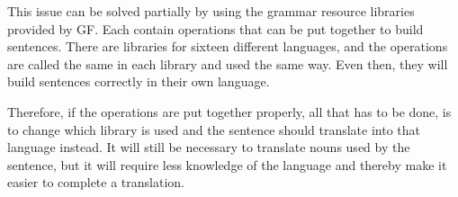 This issue can be solved partially by using the grammar resource libraries provided by GF. Each contain operations that can be put together to build sentences. There are libraries for sixteen different languages, and the operations are called the same in each library and used the same way. Even then, they will build sentences correctly in their own language.

Therefore, if the operations are put together properly, all that has to be done, is to change which library is used and the sentence should translate into that language instead. It will still be necessary to translate nouns used by the sentence, but it will require less knowledge of the language and thereby make it easier to complete a translation.